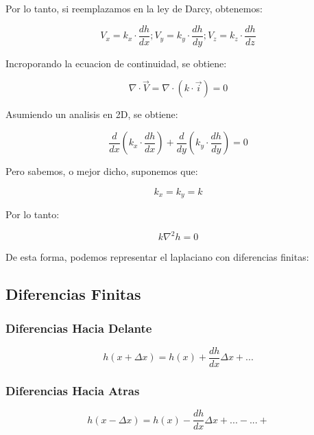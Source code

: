 Por lo tanto, si reemplazamos en la ley de Darcy, obtenemos:

\begin{equation}
    V_x = k_x\cdot \frac{dh}{dx}; V_y = k_y\cdot \frac{dh}{dy}; V_z = k_z\cdot \frac{dh}{dz}
\end{equation}

Incroporando la ecuacion de continuidad, se obtiene:

\begin{equation}
    \nabla \cdot \vec{V} = \nabla \cdot (k \cdot \vec{i}) = 0
\end{equation}

Asumiendo un analisis en 2D, se obtiene:

\begin{equation}
    \frac{d}{dx}(k_x \cdot \frac{dh}{dx}) + \frac{d}{dy}(k_y \cdot \frac{dh}{dy}) = 0
\end{equation}

Pero sabemos, o mejor dicho, suponemos que:

\begin{equation}
    k_x = k_y = k
\end{equation}

Por lo tanto:

\begin{equation}
    k \nabla^2 h = 0
\end{equation}

De esta forma, podemos representar el laplaciano con diferencias finitas:

\subsection{Diferencias Finitas}

\subsubsection{Diferencias Hacia Delante}

\begin{equation}
    h(x + \Delta x) = h(x) + \frac{dh}{dx} \Delta x + ...
\end{equation}

\subsubsection{Diferencias Hacia Atras}

\begin{equation}
    h(x - \Delta x) = h(x) - \frac{dh}{dx} \Delta x + ...-...+
\end{equation}

